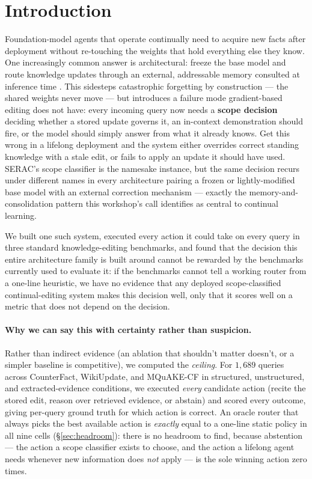 \documentclass{article}
\begin{document}
\section{Introduction}
\label{sec:intro}

Foundation-model agents that operate continually need to acquire new facts
after deployment without re-touching the weights that hold everything else
they know. One increasingly common answer is architectural: freeze the base
model and route knowledge updates through an external, addressable memory
consulted at inference time
\citep{mitchell2022serac,hartvigsen2023grace,wang2024wise}. This sidesteps
catastrophic forgetting by construction --- the shared weights never move
--- but introduces a failure mode gradient-based editing does not have:
every incoming query now needs a \textbf{scope decision} deciding whether a
stored update governs it, an in-context demonstration should fire, or the
model should simply answer from what it already knows. Get this wrong in a
lifelong deployment and the system either overrides correct standing
knowledge with a stale edit, or fails to apply an update it should have
used. SERAC's scope classifier \citep{mitchell2022serac} is the namesake
instance, but the same decision recurs under different names in every
architecture pairing a frozen or lightly-modified base model with an
external correction mechanism --- exactly the memory-and-consolidation
pattern this workshop's call identifies as central to continual learning.

We built one such system, executed every action it could take on every
query in three standard knowledge-editing benchmarks, and found that the
decision this entire architecture family is built around cannot be
rewarded by the benchmarks currently used to evaluate it: if the
benchmarks cannot tell a working router from a one-line heuristic, we have
no evidence that any deployed scope-classified continual-editing system
makes this decision well, only that it scores well on a metric that does
not depend on the decision.

\paragraph{Why we can say this with certainty rather than suspicion.}
Rather than indirect evidence (an ablation that shouldn't matter doesn't,
or a simpler baseline is competitive), we computed the \emph{ceiling}. For
$1{,}689$ queries across CounterFact, WikiUpdate, and MQuAKE-CF in
structured, unstructured, and extracted-evidence conditions, we executed
\emph{every} candidate action (recite the stored edit, reason over
retrieved evidence, or abstain) and scored every outcome, giving per-query
ground truth for which action is correct. An oracle router that always
picks the best available action is \emph{exactly} equal to a one-line
static policy in all nine cells (\S\ref{sec:headroom}): there is no
headroom to find, because abstention --- the action a scope classifier
exists to choose, and the action a lifelong agent needs whenever new
information does \emph{not} apply --- is the sole winning action zero
times.
\end{document}
